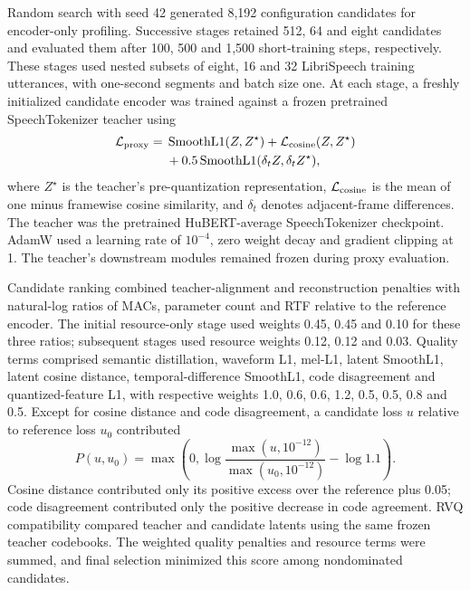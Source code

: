 Random search with seed 42 generated 8,192 configuration candidates for encoder-only profiling. Successive stages retained 512, 64 and eight candidates and evaluated them after 100, 500 and 1,500 short-training steps, respectively. These stages used nested subsets of eight, 16 and 32 LibriSpeech training utterances, with one-second segments and batch size one. At each stage, a freshly initialized candidate encoder was trained against a frozen pretrained SpeechTokenizer teacher using
\begin{equation}
\begin{split}
 \mathcal L_{\rm proxy}={}&
 \operatorname{SmoothL1}(Z,Z^\star)
 +\mathcal L_{\rm cosine}(Z,Z^\star)\\
 &+0.5\operatorname{SmoothL1}
       (\delta_t Z,\delta_t Z^\star),
\end{split}
\end{equation}
where $Z^\star$ is the teacher's pre-quantization representation, $\mathcal L_{\rm cosine}$ is the mean of one minus framewise cosine similarity, and $\delta_t$ denotes adjacent-frame differences. The teacher was the pretrained HuBERT-average SpeechTokenizer checkpoint. AdamW used a learning rate of $10^{-4}$, zero weight decay and gradient clipping at 1. The teacher's downstream modules remained frozen during proxy evaluation.

Candidate ranking combined teacher-alignment and reconstruction penalties with natural-log ratios of MACs, parameter count and RTF relative to the reference encoder. The initial resource-only stage used weights 0.45, 0.45 and 0.10 for these three ratios; subsequent stages used resource weights 0.12, 0.12 and 0.03. Quality terms comprised semantic distillation, waveform L1, mel-L1, latent SmoothL1, latent cosine distance, temporal-difference SmoothL1, code disagreement and quantized-feature L1, with respective weights 1.0, 0.6, 0.6, 1.2, 0.5, 0.5, 0.8 and 0.5. Except for cosine distance and code disagreement, a candidate loss $u$ relative to reference loss $u_0$ contributed
\begin{equation}
 P(u,u_0)=\max\!\left(0,\log\frac{\max(u,10^{-12})}
 {\max(u_0,10^{-12})}-\log 1.1\right).
\end{equation}
Cosine distance contributed only its positive excess over the reference plus 0.05; code disagreement contributed only the positive decrease in code agreement. RVQ compatibility compared teacher and candidate latents using the same frozen teacher codebooks. The weighted quality penalties and resource terms were summed, and final selection minimized this score among nondominated candidates.

